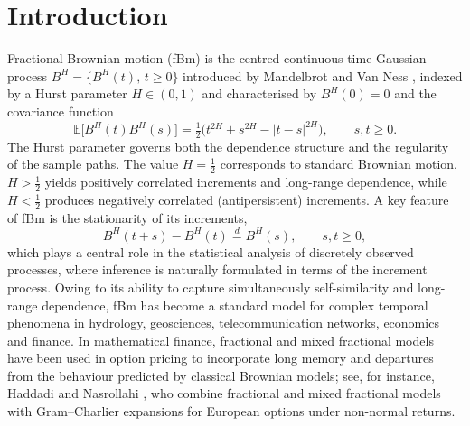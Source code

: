 \documentclass[11pt,reqno]{amsart}
\numberwithin{equation}{section}
\theoremstyle{plain}
\theoremstyle{definition}
\theoremstyle{remark}
\newcommand{\E}{\mathbb{E}}
\begin{document}
\maketitle

\section{Introduction}

Fractional Brownian motion (fBm) is the centred continuous-time Gaussian process
$B^{H}=\{B^{H}(t),\,t\ge0\}$ introduced by Mandelbrot and Van Ness \cite{MVN68}, indexed
by a Hurst parameter $H\in(0,1)$ and characterised by $B^{H}(0)=0$ and the covariance
function
\begin{equation}\label{eq:fbmcov}
  \E\bigl[B^{H}(t)B^{H}(s)\bigr]=\tfrac12\bigl(t^{2H}+s^{2H}-|t-s|^{2H}\bigr),
  \qquad s,t\ge0 .
\end{equation}
The Hurst parameter governs both the dependence structure and the regularity of the
sample paths. The value $H=\frac12$ corresponds to standard Brownian motion,
$H>\frac12$ yields positively correlated increments and long-range dependence, while
$H<\frac12$ produces negatively correlated (antipersistent) increments. A key feature of
fBm is the stationarity of its increments,
\begin{equation}\label{eq:statincr}
  B^{H}(t+s)-B^{H}(t)\overset{d}{=}B^{H}(s),\qquad s,t\ge0,
\end{equation}
which plays a central role in the statistical analysis of discretely observed processes,
where inference is naturally formulated in terms of the increment process. Owing to its
ability to capture simultaneously self-similarity and long-range dependence, fBm has
become a standard model for complex temporal phenomena in hydrology, geosciences,
telecommunication networks, economics and finance. In mathematical finance, fractional
and mixed fractional models have been used in option pricing to incorporate long memory
and departures from the behaviour predicted by classical Brownian models; see, for
instance, Haddadi and Nasrollahi \cite{HN25}, who combine fractional and mixed fractional
models with Gram--Charlier expansions for European options under non-normal returns.
\end{document}
